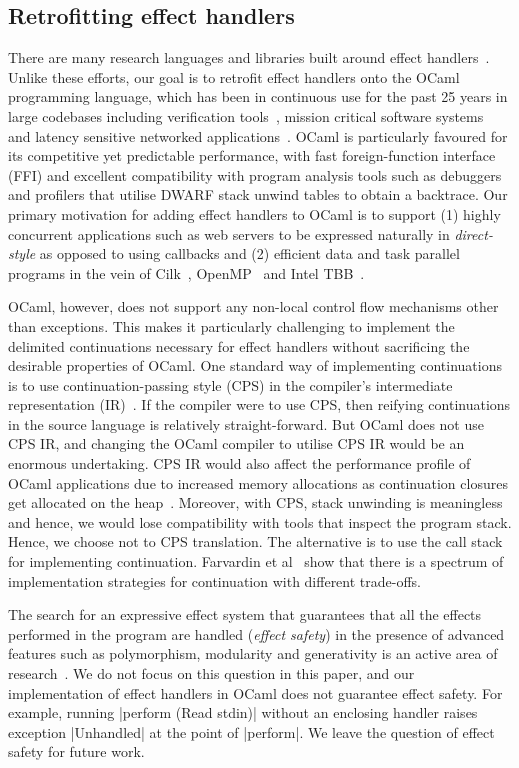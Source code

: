 \documentclass[sigplan,10pt,review,anonymous]{acmart}\settopmatter{printfolios=true,printccs=false,printacmref=false}
\begin{document}
\subsection{Retrofitting effect handlers}
\label{sec:req}

There are many research languages and libraries built around effect
handlers~\cite{Koka,Links,Pyro,Frank,Eff}. Unlike these efforts, our goal is to
retrofit effect handlers onto the OCaml programming language, which has been in
continuous use for the past 25 years in large codebases including verification
tools~\cite{FStar,Coq}, mission critical software systems~\cite{astree} and
latency sensitive networked applications~\cite{JS,Docker,MirageOS}. OCaml is
particularly favoured for its competitive yet predictable performance, with
fast foreign-function interface (FFI) and excellent compatibility with program
analysis tools such as debuggers and profilers that utilise DWARF stack unwind
tables to obtain a backtrace. Our primary motivation for adding effect handlers
to OCaml is to support (1) highly concurrent applications such as web servers
to be expressed naturally in \emph{direct-style} as opposed to using callbacks
and (2) efficient data and task parallel programs in the vein of Cilk~\cite{},
OpenMP~\cite{} and Intel TBB~\cite{}.

OCaml, however, does not support any non-local control flow mechanisms other
than exceptions. This makes it particularly challenging to implement the
delimited continuations necessary for effect handlers without sacrificing the
desirable properties of OCaml. One standard way of implementing continuations
is to use continuation-passing style (CPS) in the compiler's intermediate
representation (IR)~\cite{Koka}. If the compiler were to use CPS, then reifying
continuations in the source language is relatively straight-forward. But OCaml
does not use CPS IR, and changing the OCaml compiler to utilise CPS IR would be
an enormous undertaking. CPS IR would also affect the performance profile of
OCaml applications due to increased memory allocations as continuation closures
get allocated on the heap~\cite{Folklore}. Moreover, with CPS, stack unwinding
is meaningless and hence, we would lose compatibility with tools that inspect
the program stack. Hence, we choose not to CPS translation. The alternative is
to use the call stack for implementing continuation. Farvardin et
al~\cite{Folklore} show that there is a spectrum of implementation strategies
for continuation with different trade-offs.

The search for an expressive effect system that guarantees that all the effects
performed in the program are handled (\emph{effect safety}) in the presence of
advanced features such as polymorphism, modularity and generativity is an
active area of research~\cite{Leijen14, Biernacki19, Biernacki20,
Hillerstrom20}. We do not focus on this question in this paper, and our
implementation of effect handlers in OCaml does not guarantee effect safety.
For example, running |perform (Read stdin)| without an enclosing handler raises
exception |Unhandled| at the point of |perform|. We leave the question of
effect safety for future work.
\end{document}
